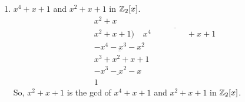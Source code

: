 \documentclass[../hw4]{subfiles}
\begin{document}
\begin{problem}
\begin{enumerate}[label=\roman*)]
	\item $x^4 + x+1$ and $x^2 + x + 1$ in $\mathbb{Z}_2[x]$.
	      \[
		      \begin{array}{r}
			      x^2 + x\phantom{ + 00}                                                      \\
			      x^2 + x + 1 \big)\overline{\phantom{aa} x^4\phantom{ + x^3 + x^20} + x + 1} \\
			      \underline{ -x^4-x^3-x^2 }\phantom{ + x + 00}                               \\
			      x^3 + x^2 + x + 1                                                           \\
			      \underline{-x^3-x^2-x}\phantom{ + 00}                                       \\
			      1
		      \end{array}
	      \]
	      So, $x^2 + x + 1$ is the gcd of $x^4 + x + 1$ and $x^2 + x + 1$ in $\mathbb{Z}_2[x]$.
\end{enumerate}
\end{problem}
\end{document}
